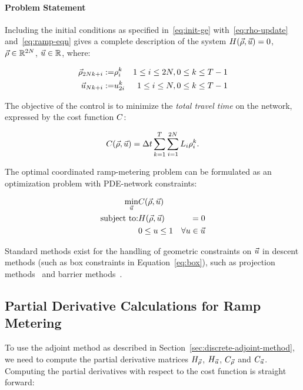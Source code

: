 \paragraph{Problem Statement}

Including the initial conditions as specified in~\eqref{eq:init-ge}
with~\eqref{eq:rho-update} and~\eqref{eq:ramp-eqn} gives
a complete description of the system $\sys\left(\state,\control\right)=0$,
$\vec{\rho}\in\mathbb{R}^{2N}$, $\vec{u}\in\mathbb{R}$, where:

\begin{eqnarray*}
\vec{\rho}_{2Nk+i}:= & \rho_{i}^{k} & 1\le i\le2N,0\le k\le T-1\\
\vec{u}_{Nk+i}:= & u_{2i}^{k} & 1\le i\le N,0\le k\le T-1
\end{eqnarray*}


The objective of the control is to minimize the \emph{total travel
time }on the network, expressed by the cost function $C$:

\[
\cost\left(\state,\control\right)=\Delta t\sum_{k=1}^{T}\sum_{i=1}^{2\nlinks}L_{i}\densitydiscrete{\link}{\tind}.
\]


The optimal coordinated ramp-metering problem can be formulated as
an optimization problem with PDE-network constraints:

\begin{eqnarray}
\min_{\control} & \cost\left(\state,\control\right)\label{eq:full}\\
\text{subject to:} & \sys\left(\state,\control\right) & =0\nonumber \\
& 0\le\convar\le1 & \forall\convar\in\control  \label{eq:box}
\end{eqnarray}

Standard methods exist for the handling of geometric constraints on $\vec{u}$ in descent methods (such as box constraints in Equation~\eqref{eq:box}), such as projection methods~\cite{Apice2010Modeling} and barrier methods~\cite{Fiacco1990Nonlinear,Boyd2010b}.

\subsection{Partial Derivative Calculations for Ramp Metering}
\label{sec:Applications-to-Optimal}

To use the adjoint method as described in Section~\ref{sec:discrete-adjoint-method},
we need to compute the partial derivative matrices $H_{\vec{\rho}}$, $H_{\vec{u}}$,
$C_{\vec{\rho}}$ and $C_{\vec{u}}$. Computing the partial
derivatives with respect to the cost function is straight forward:

